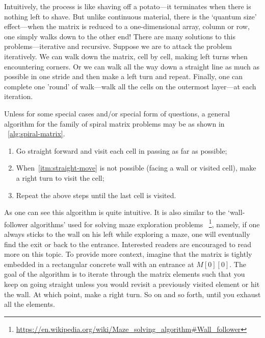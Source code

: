 \documentclass[oneside,11pt]{book}
\theoremstyle{definition}
\theoremstyle{remark}
\begin{document}
Intuitively, the process is like shaving off a potato---it
terminates when there is nothing left to shave.
But unlike continuous material, there is the `quantum size' effect---when the matrix is reduced
to a one-dimensional array, column or row, one simply walks down to the other end!
There are many solutions to this problems---iterative and recursive.
Suppose we are to attack the problem iteratively.
We can walk down the matrix, cell by cell, making left turns when encountering corners.
Or we can walk all the way down a straight line as much as possible in one stride and then make a
left turn and repeat.
Finally, one can complete one 'round' of walk---walk all the cells on the
outermost layer---at each iteration.

Unless for some special cases and/or special form of questions,
a general algorithm for the family of spiral matrix problems may be as shown in
~\autoref{alg:spiral-matrix}.
\begin{alisting}
    \caption{\label{alg:spiral-matrix}Generic algorithm for matrix spiralization.}
    \begin{enumerate}[label=\textbf{Step.\arabic*}]
        \label{enum:algorithm}
        \item\label{itm:straight-move} Go straight forward
        and visit each cell in passing as far as possible;
        \item\label{itm:turn-right} When~\ref{itm:straight-move} is not possible
        (facing a wall or visited cell), make a right turn to visit the cell;
        \item\label{itm:goto-terminate} Repeat the above steps until the last cell is visited.
    \end{enumerate}
\end{alisting}
As one can see this algorithm is quite intuitive.
It is also similar to the `wall-follower algorithms' used for solving maze
exploration problems
~\footnote{\url{https://en.wikipedia.org/wiki/Maze_solving_algorithm\#Wall_follower}}, namely,
if one always sticks to the wall on his left while exploring a maze, one will
eventually find the exit or back to the entrance.
Interested readers are encouraged to read more on this topic.
To provide more context,
imagine that the matrix is tightly embedded in a rectangular concrete wall with an entrance at
$M[0][0]$.
The goal of the algorithm is to iterate through the matrix elements such that you keep on going
straight unless
you would revisit a previously visited element or hit the wall.
At which point, make a right turn.
So on and so forth, until you exhaust all the elements.
\end{document}
